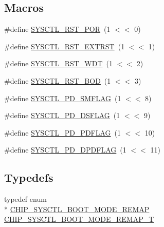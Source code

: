 \subsection*{Macros}
\begin{DoxyCompactItemize}
\item 
\#define \hyperlink{group___s_y_s_c_t_l__17_x_x__40_x_x_gaeb159c3928c725d8e218dbb5426f99b8}{S\+Y\+S\+C\+T\+L\+\_\+\+R\+S\+T\+\_\+\+P\+O\+R}~(1 $<$$<$ 0)
\item 
\#define \hyperlink{group___s_y_s_c_t_l__17_x_x__40_x_x_ga7e481a088f2ff36fc65b77dbb25a749a}{S\+Y\+S\+C\+T\+L\+\_\+\+R\+S\+T\+\_\+\+E\+X\+T\+R\+S\+T}~(1 $<$$<$ 1)
\item 
\#define \hyperlink{group___s_y_s_c_t_l__17_x_x__40_x_x_ga84b4a0f567758052c1f4097d51aaa1ae}{S\+Y\+S\+C\+T\+L\+\_\+\+R\+S\+T\+\_\+\+W\+D\+T}~(1 $<$$<$ 2)
\item 
\#define \hyperlink{group___s_y_s_c_t_l__17_x_x__40_x_x_gab1441ee02763d5fa7073bcf026036784}{S\+Y\+S\+C\+T\+L\+\_\+\+R\+S\+T\+\_\+\+B\+O\+D}~(1 $<$$<$ 3)
\item 
\#define \hyperlink{group___s_y_s_c_t_l__17_x_x__40_x_x_gab8cdb571c0a7cd9485523882eb033f79}{S\+Y\+S\+C\+T\+L\+\_\+\+P\+D\+\_\+\+S\+M\+F\+L\+A\+G}~(1 $<$$<$ 8)
\item 
\#define \hyperlink{group___s_y_s_c_t_l__17_x_x__40_x_x_ga25e12d7c7721dd11b00c5a7a8ec51457}{S\+Y\+S\+C\+T\+L\+\_\+\+P\+D\+\_\+\+D\+S\+F\+L\+A\+G}~(1 $<$$<$ 9)
\item 
\#define \hyperlink{group___s_y_s_c_t_l__17_x_x__40_x_x_ga64388699b0fcd5317d80927e6c8a1db9}{S\+Y\+S\+C\+T\+L\+\_\+\+P\+D\+\_\+\+P\+D\+F\+L\+A\+G}~(1 $<$$<$ 10)
\item 
\#define \hyperlink{group___s_y_s_c_t_l__17_x_x__40_x_x_ga6b2596afa60ba5439b3bb53e88df3e62}{S\+Y\+S\+C\+T\+L\+\_\+\+P\+D\+\_\+\+D\+P\+D\+F\+L\+A\+G}~(1 $<$$<$ 11)
\end{DoxyCompactItemize}
\subsection*{Typedefs}
\begin{DoxyCompactItemize}
\item 
typedef enum \\*
\hyperlink{group___s_y_s_c_t_l__17_x_x__40_x_x_ga08779259bb52e97fa1491aa0047da2c6}{C\+H\+I\+P\+\_\+\+S\+Y\+S\+C\+T\+L\+\_\+\+B\+O\+O\+T\+\_\+\+M\+O\+D\+E\+\_\+\+R\+E\+M\+A\+P} \hyperlink{group___s_y_s_c_t_l__17_x_x__40_x_x_gaacc03dffa90a522f3fc992e9940d196e}{C\+H\+I\+P\+\_\+\+S\+Y\+S\+C\+T\+L\+\_\+\+B\+O\+O\+T\+\_\+\+M\+O\+D\+E\+\_\+\+R\+E\+M\+A\+P\+\_\+\+T}
\end{DoxyCompactItemize}
